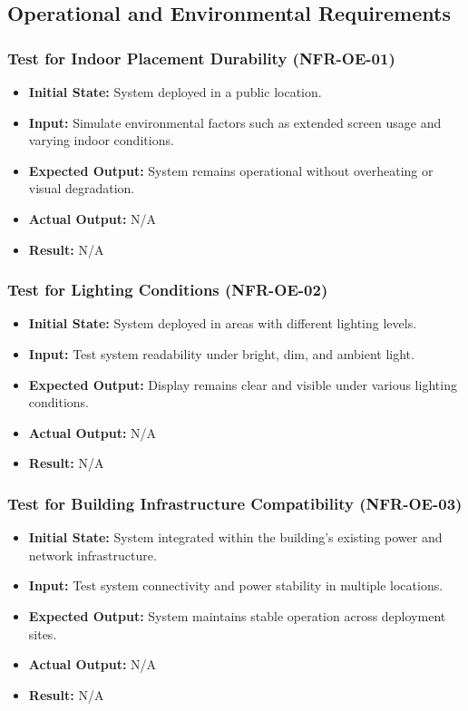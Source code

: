 \documentclass[12pt, titlepage]{article}
\begin{document}
\subsection{Operational and Environmental Requirements}

\subsubsection{Test for Indoor Placement Durability (NFR-OE-01)}
\begin{itemize}
    \item \textbf{Initial State: }System deployed in a public location.
    \item \textbf{Input: }Simulate environmental factors such as extended screen usage and varying indoor conditions.
    \item \textbf{Expected Output: }System remains operational without overheating or visual degradation.
    \item \textbf{Actual Output: } N/A
    \item \textbf{Result: }N/A
\end{itemize}

\subsubsection{Test for Lighting Conditions (NFR-OE-02)}
\begin{itemize}
    \item \textbf{Initial State: }System deployed in areas with different lighting levels.
    \item \textbf{Input: }Test system readability under bright, dim, and ambient light.
    \item \textbf{Expected Output: }Display remains clear and visible under various lighting conditions.
    \item \textbf{Actual Output: } N/A
    \item \textbf{Result: }N/A
\end{itemize}

\subsubsection{Test for Building Infrastructure Compatibility (NFR-OE-03)}
\begin{itemize}
    \item \textbf{Initial State: }System integrated within the building's existing power and network infrastructure.
    \item \textbf{Input: }Test system connectivity and power stability in multiple locations.
    \item \textbf{Expected Output: }System maintains stable operation across deployment sites.
    \item \textbf{Actual Output: } N/A
    \item \textbf{Result: }N/A
\end{itemize}
\end{document}
